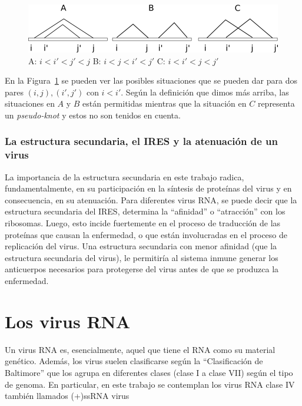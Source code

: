 \begin{figure}
 \centering
  \includegraphics[scale=0.8]{possiblestr}
  \caption{A: $i < i' < j' < j$ B: $i < j < i' < j'$ C: $i < i' < j < j'$}
  \label{possiblestr}
\end{figure}

En la Figura~\ref{possiblestr} se pueden ver las posibles situaciones que se
pueden dar para dos pares $(i,j),(i',j')$ con $i < i'$. Seg\'un la definici\'on
que dimos m\'as arriba, las situaciones en $A$ y $B$ est\'an permitidas mientras
que la situaci\'on en $C$ representa un \textit{pseudo-knot} y estos no son
tenidos en cuenta.

\subsubsection{La estructura secundaria, el \ac{IRES} y la atenuaci\'on de un
virus}

La importancia de la estructura secundaria en este trabajo radica,
fundamentalmente, en su participaci\'on en la s\'intesis de prote\'inas del
virus y en consecuencia, en su atenuaci\'on. Para diferentes virus \ac{RNA}, se
puede decir que la estructura secundaria del \ac{IRES}, determina la
``afinidad'' o ``atracci\'on'' con los ribosomas. Luego, esto incide fuertemente
en el proceso de traducci\'on de las prote\'inas que causan la enfermedad, o que
est\'an involucradas en el proceso de replicaci\'on del virus. Una estructura
secundaria con menor afinidad (que la estructura secundaria del virus), le
permitir\'ia al sistema inmune generar los anticuerpos necesarios para
protegerse del virus antes de que se produzca la enfermedad.

\section{Los virus \ac{RNA}}
\label{virus}
Un virus \ac{RNA} es, esencialmente, aquel que tiene el \ac{RNA} como su
material gen\'etico. Adem\'as, los virus suelen clasificarse seg\'un la
``Clasificaci\'on de Baltimore'' que los agrupa en diferentes clases (clase I a
clase VII) seg\'un el tipo de genoma. En particular, en este trabajo se
contemplan los virus \ac{RNA} clase IV tambi\'en llamados \ac{(+)ssRNA virus}

